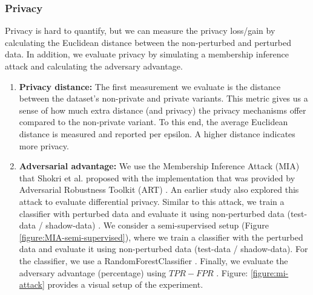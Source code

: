 \subsubsection{Privacy}
Privacy is hard to quantify, but we can measure the privacy loss/gain by calculating the Euclidean distance between the non-perturbed and perturbed data.
In addition, we evaluate privacy by simulating a membership inference attack and calculating the adversary advantage.
\begin{enumerate}
  \item \textbf{Privacy distance: }
        The first measurement we evaluate is the distance between the dataset's non-private and private variants.
        This metric gives us a sense of how much extra distance (and privacy) the privacy mechanisms offer compared to the non-private variant.
        To this end, the average Euclidean distance is measured and reported per epsilon. A higher distance indicates more privacy.
  \item \textbf{Adversarial advantage: }
        We use the Membership Inference Attack (MIA) that Shokri et al. proposed with the implementation that was provided by Adversarial Robustness Toolkit (ART) \citep{nicolae_adversarial_2019}.
        An earlier study also explored this attack to evaluate differential privacy.
        Similar to this attack, we train a classifier with perturbed data and evaluate it using non-perturbed data (test-data / shadow-data) \citep{zhao_not_2020}.
        We consider a semi-supervised setup (Figure \ref{figure:MIA-semi-supervised}), where we train a classifier with the perturbed data and evaluate it using non-perturbed data (test-data / shadow-data).
        For the classifier, we use a RandomForestClassifier \citep{rigaki_survey_2021}.
        Finally, we evaluate the adversary advantage (percentage) using $TPR - FPR$ \citep{yeom_privacy_2018}.
        Figure: \ref{figure:mi-attack} provides a visual setup of the experiment.


\end{enumerate}
